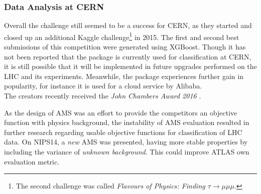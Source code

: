 \subsubsection{Data Analysis at CERN}
Overall the challenge still seemed to be a success for CERN, as they started and closed up an additional Kaggle challenge\footnote{The second challenge was called \emph{Flavours of Physics: Finding $\tau \rightarrow \mu\mu\mu$}.} in 2015. The first and second best submissions of this competition were generated using XGBoost. Though it has not been reported that the package is currently used for classification at CERN, it is still possible that it will be implemented in future upgrades performed on the LHC and its experiments. Meanwhile, the package experiences further gain in popularity, for instance it is used for a cloud service by Alibaba.\\
The creators recently received the \emph{John Chambers Award 2016} \cite{xgbgit}.

As the design of AMS was an effort to provide the competitors an objective function with physics background, the instability of AMS evaluation resulted in further research regarding usable objective functions for classification of LHC data\cite{HEPml}. On NIPS14, a \emph{new} AMS was presented, having more stable properties by including the variance of \emph{unknown background}. This could improve ATLAS own evaluation metric\cite{kegl14}.


	{\pagebreak \thispagestyle{empty} \cleardoublepage}{\clearpage}